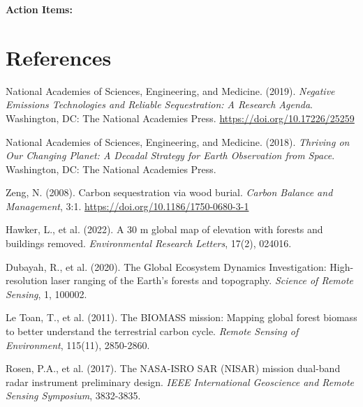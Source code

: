 \documentclass[11pt,letterpaper]{article}
\begin{document}
\noindent\textbf{Action Items:}

\vspace{3cm}


\section*{References}

\begin{enumerate}[label={[\arabic*]}, leftmargin=*]
    \item National Academies of Sciences, Engineering, and Medicine. (2019). \textit{Negative Emissions Technologies and Reliable Sequestration: A Research Agenda}. Washington, DC: The National Academies Press. \url{https://doi.org/10.17226/25259}

    \item National Academies of Sciences, Engineering, and Medicine. (2018). \textit{Thriving on Our Changing Planet: A Decadal Strategy for Earth Observation from Space}. Washington, DC: The National Academies Press.

    \item Zeng, N. (2008). Carbon sequestration via wood burial. \textit{Carbon Balance and Management}, 3:1. \url{https://doi.org/10.1186/1750-0680-3-1}

    \item Hawker, L., et al. (2022). A 30 m global map of elevation with forests and buildings removed. \textit{Environmental Research Letters}, 17(2), 024016.

    \item Dubayah, R., et al. (2020). The Global Ecosystem Dynamics Investigation: High-resolution laser ranging of the Earth's forests and topography. \textit{Science of Remote Sensing}, 1, 100002.

    \item Le Toan, T., et al. (2011). The BIOMASS mission: Mapping global forest biomass to better understand the terrestrial carbon cycle. \textit{Remote Sensing of Environment}, 115(11), 2850-2860.

    \item Rosen, P.A., et al. (2017). The NASA-ISRO SAR (NISAR) mission dual-band radar instrument preliminary design. \textit{IEEE International Geoscience and Remote Sensing Symposium}, 3832-3835.
\end{enumerate}
\end{document}
